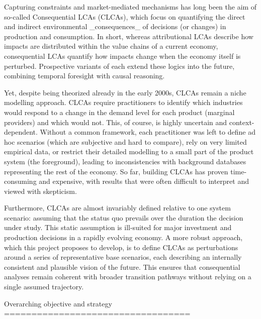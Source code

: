 \documentclass[compact]{nserc} %
\begin{document}
\begin{markdown}
Capturing constraints and market-mediated mechanisms has long been the aim of so-called Consequential LCAs (CLCAs), which focus on quantifying the direct and indirect environmental _consequences_ of decisions (or changes) in production and consumption. In short, whereas attributional LCAs describe how impacts are distributed within the value chains of a current economy, consequential LCAs quantify how impacts change when the economy itself is perturbed. Prospective variants of each extend these logics into the future, combining temporal foresight with causal reasoning.

Yet, despite being theorized already in the early 2000s, CLCAs remain a niche modelling approach. CLCAs require practitioners to identify which industries would respond to a change in the demand level for each product (marginal providers) and which would not. This, of course, is highly uncertain and context-dependent. Without a common framework, each practitioner was left to define ad hoc scenarios (which are subjective and hard to compare), rely on very limited empirical data, or restrict their detailed modelling to a small part of the product system (the foreground), leading to inconsistencies with background databases representing the rest of the economy. So far, building CLCAs has proven time-consuming and expensive, with results that were often difficult to interpret and viewed with skepticism.

Furthermore, CLCAs are almost invariably defined relative to one system scenario: assuming that the status quo prevails over the duration the decision under study. This static assumption is ill-suited for major investment and production decisions in a rapidly evolving economy. A more robust approach, which this project proposes to develop, is to define CLCAs as perturbations around a series of representative base scenarios, each describing an internally consistent and plausible vision of the future. This ensures that consequential analyses remain coherent with broader transition pathways without relying on a single assumed trajectory.



Overarching objective and strategy
==================================


\end{markdown}
\end{document}
